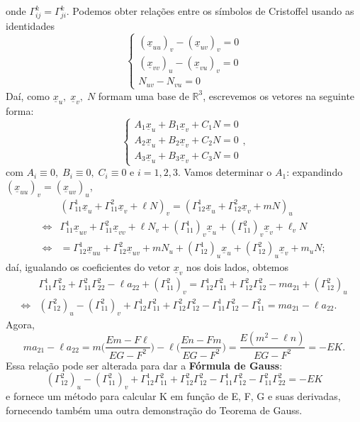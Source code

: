 \documentclass[../differential_geometry.tex]{subfiles}
\begin{document}
onde \(\Gamma_{ij}^{k} = \Gamma_{ji}^{k}\). Podemos obter relações entre os símbolos de Cristoffel usando as identidades
\[
	\left\{\begin{array}{ll}
		(\underline{x}_{uu})_{v} - (\underline{x}_{uv})_{v} = 0 \\
		(\underline{x}_{vv})_{u} - (\underline{x}_{vu})_{v} = 0 \\
		N_{uv} - N_{vu} = 0
	\end{array}\right.
\]
Daí, como \(\underline{x}_{u},\; \underline{x}_{v},\; N\) formam uma base de \(\mathbb{R}^{3}\), escrevemos os vetores na seguinte forma:
\[
	\left\{\begin{array}{ll}
		A_{1}\underline{x}_{u} + B_1\underline{x}_{v} + C_1 N = 0 \\
		A_{2}\underline{x}_{u} + B_2\underline{x}_{v} + C_2 N = 0 \\
		A_{3}\underline{x}_{u} + B_3\underline{x}_{v} + C_3 N = 0
	\end{array}\right.,
\]
com \(A_{i}\equiv 0,\; B_{i}\equiv 0,\; C_{i}\equiv 0\) e \(i=1, 2, 3.\) Vamos determinar o \(A_1\): expandindo \((\underline{x}_{uu})_{v} = (\underline{x}_{uv})_{u}\),
\begin{align*}
	                    & (\Gamma_{11}^{1}\underline{x}_{u} + \Gamma_{11}^{2}\underline{x}_{v} + \ell N)_{v} = (\Gamma_{12}^{1}\underline{x}_{u} + \Gamma_{12}^{2}\underline{x}_{v} + mN)_{u}              \\
	\Longleftrightarrow & \Gamma_{11}^{1}\underline{x}_{uv} + \Gamma_{11}^{2}\underline{x}_{vv} + \ell N_{v} + (\Gamma_{11}^{1})_{v}\underline{x}_{u} + (\Gamma_{11}^{2})_{v}\underline{x}_{v} + \ell_{v}N \\
	\Longleftrightarrow & =\Gamma_{12}^{1}\underline{x}_{uu} + \Gamma_{12}^{2}\underline{x}_{uv} + mN_{u} + (\Gamma_{12}^{1})_{u}\underline{x}_{u} + (\Gamma_{12}^{2})_{u}\underline{x}_{v} + m_{u}N;
\end{align*}
daí, igualando os coeficientes do vetor \(\underline{x}_{v}\) nos dois lados, obtemos
\begin{align*}
	                    & \Gamma_{11}^{1}\Gamma_{12}^{2} + \Gamma_{11}^{2}\Gamma_{22}^{2}-\ell a_{22}+(\Gamma_{11}^{2})_{v} = \Gamma_{12}^{1}\Gamma_{11}^{2} + \Gamma_{12}^{2}\Gamma_{12}^{2}-ma_{21}+(\Gamma_{12}^{2})_{u} \\
	\Longleftrightarrow & (\Gamma_{12}^{2})_{u}-(\Gamma_{11}^{2})_{v}+\Gamma_{12}^{1}\Gamma_{11}^{2} + \Gamma_{12}^{2}\Gamma_{12}^{2}-\Gamma_{11}^{1}\Gamma_{12}^{2}-\Gamma_{11}^{2}=ma_{21}-\ell a_{22}.
\end{align*}
Agora,
\[
	ma_{21}-\ell a_{22} = m \biggl(\frac{Em- F \ell }{EG-F^{2}}\biggr) - \ell \biggl(\frac{En - Fm}{EG-F^{2}}\biggr) = \frac{E(m^{2}-\ell n)}{EG-F^{2}}=-EK.
\]
Essa relação pode ser alterada para dar a \textbf{\hypertarget{gauss_formula}{Fórmula de Gauss}}:
\[
	\boxed{(\Gamma_{12}^{2})_{u}-(\Gamma_{11}^{2})_{v}+\Gamma_{12}^{1}\Gamma_{11}^{2} + \Gamma_{12}^{2}\Gamma_{12}^{2}-\Gamma_{11}^{1}\Gamma_{12}^{2}-\Gamma_{11}^{2}\Gamma_{22}^{2}=-EK }
\]
e fornece um método para calcular K em função de E, F, G e suas derivadas, fornecendo também uma outra demonstração do Teorema de Gauss.
\end{document}
